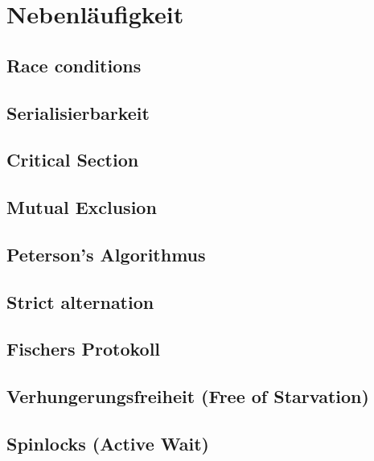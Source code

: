 \section{Nebenläufigkeit}

    
    
    

    
    
    
    
    
    
    
  
    
    

    
\subsection{Race conditions}

\subsection{Serialisierbarkeit}

\subsection{Critical Section}

\subsection{Mutual Exclusion}

\subsection{Peterson's Algorithmus}

\subsection{Strict alternation}

\subsection{Fischers Protokoll}

\subsection{Verhungerungsfreiheit (Free of Starvation)}

\subsection{Spinlocks (Active Wait)}

